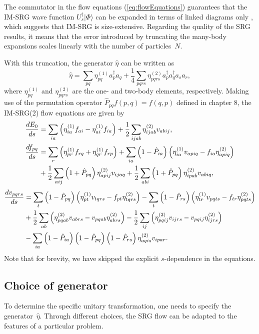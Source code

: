 The
commutator in the flow equations (\ref{eq:flowEquations}) guarantees
that the IM-SRG wave function $U_s^\dagger|\Phi\rangle$ can be
expanded in terms of linked diagrams only
\cite{Shavitt:2009,Hergert:2016jk,Hergert:2016ng}, which suggests that IM-SRG
is size-extensive. Regarding the quality of the SRG results, it means
that the error introduced by truncating the many-body expansions
scales linearly with the number of particles~$N$.

With this
truncation, the generator $\hat{\eta}$ can be written as
\[
\hat{\eta} = \sum_{pq} \eta_{pq}^{(1)} a_p^{\dagger}a_q  +
\frac{1}{4}\sum\limits_{pqrs}\eta_{pqrs}^{(2)} a_p^{\dagger}a_q^{\dagger}a_s
a_r,
\]
where $\eta_{pq}^{(1)}$ and $ \eta_{pqrs}^{(2)}$ are the one- and
two-body elements, respectively. Making use of the permutation
operator $ \hat{P}_{pq}f(p,q) = f(q,p)$ defined in chapter 8, the IM-SRG(2) flow equations
are given by
\begin{align}
\frac{d E_0}{ds} &= \sum_{ia}\left( \eta_{ia}^{(1)}f_{ai} -
\eta_{ai}^{(1)}f_{ia}\right) +
\frac{1}{2}\sum_{ijab}\eta_{ijab}^{(2)}v_{abij},
\label{eq:flow1}\\
\frac{d f_{pq}}{ds}&= \sum_r \left(\eta_{pr}^{(1)}f_{rq} +
\eta_{qr}^{(1)}f_{rp}\right) + \sum_{ia}\left(1-\hat{P}_{ia}\right)\left(
\eta_{ia}^{(1)}v_{apiq} - f_{ia}\eta_{apiq}^{(2)} \right)\notag \\ &
+\frac{1}{2} \sum_{aij} \left(1+\hat{P}_{pq}\right)
\eta_{apij}^{(2)}v_{ijaq} + \frac{1}{2}\sum_{abi}\left(1+\hat{P}_{pq}\right) \eta_{ipab}^{(2)}v_{abiq},
\label{eq:flow2}
\end{align}
\begin{align}
\frac{d v_{pqrs}}{ds} &= \sum_t \left(1-\hat{P}_{pq} \right)\left(
\eta_{pt}^{(1)}v_{tqrs}-f_{pt}\eta_{tqrs}^{(2)}\right)-\sum_t \left(
1-\hat{P}_{rs} \right)\left(\eta_{tr}^{(1)} v_{pqts} - f_{tr}
\eta_{pqts}^{(2)}\right)\notag \\ & +\frac{1}{2}\sum_{ab}
\left(\eta_{pqab}^{(2)} v_{abrs} - v_{pqab}\eta_{abrs}^{(2)}\right)-
\frac{1}{2}\sum_{ij} \left(\eta_{pqij}^{(2)} v_{ijrs} -
v_{pqij}\eta_{ijrs}^{(2)}\right)\notag \\ & -\sum_{ia} \left(1-
\hat{P}_{ia} \right)\left(1-\hat{P}_{pq}\right)\left(1-\hat{P}_{rs} \right)
\eta_{aqis}^{(2)}v_{ipar}.
\label{eq:flow3}
\end{align}
Note that for brevity, we have skipped the explicit $s$-dependence in the equations.

\subsection{\label{sec:generator}Choice of generator}
To determine the specific unitary transformation, one needs to specify
the generator~$\hat{\eta}$. Through different choices, the SRG flow
can be adapted to the features of a particular problem.\\



